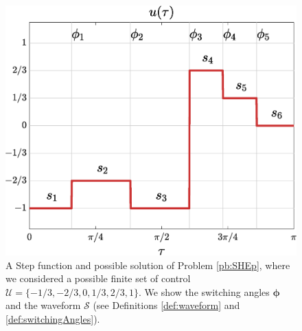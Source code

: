\begin{figure}
	\centering
	\includegraphics[scale=0.325]{img/fig01.eps} 
	\caption{A Step function and possible solution of Problem \ref{pb:SHEp}, where we considered a possible finite set of control $\mathcal{U} = \{-1/3, -2/3, 0, 1/3, 2/3, 1\}$. We show the switching angles $\bm{\phi}$ and the waveform $\mathcal{S}$ (see Definitions \ref{def:waveform} and \ref{def:switchingAngles}).}\label{fig:exampleSHE}
\end{figure}
%

